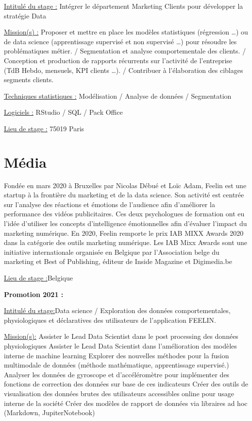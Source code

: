 \documentclass[
  letterpaper,
  DIV=11,
  numbers=noendperiod]{scrreprt}
\begin{document}
\uline{Intitulé du stage :} Intégrer le département Marketing Clients
pour développer la stratégie Data

\uline{Mission(s) :} Proposer et mettre en place les modèles
statistiques (régression \ldots) ou de data science (apprentissage
supervisé et non supervisé \ldots) pour résoudre les problématiques
métier. / Segmentation et analyse comportementale des clients. /
Conception et production de rapports récurrents sur l'activité de
l'entreprise (TdB Hebdo, mensuels, KPI clients \ldots). / Contribuer à
l'élaboration des ciblages segments clients.

\uline{Techniques statistiques :} Modélisation / Analyse de données /
Segmentation

\uline{Logiciels :} RStudio / SQL / Pack Office

\uline{Lieu de stage :} 75019 Paris


\hypertarget{muxe9dia}{%
\chapter{Média}\label{muxe9dia}}

Fondée en mars 2020 à Bruxelles par Nicolas Débué et Loïc Adam, Feelin
est une startup à la frontière du marketing et de la data science. Son
activité est centrée sur l'analyse des réactions et émotions de
l'audience afin d'améliorer la performance des vidéos publicitaires. Ces
deux psychologues de formation ont eu l'idée d'utiliser les concepts
d'intelligence émotionnelles afin d'évaluer l'impact du marketing
numérique. En 2020, Feelin remporte le prix IAB MIXX Awards 2020 dans la
catégorie des outils marketing numérique. Les IAB Mixx Awards sont une
initiative internationale organisée en Belgique par l'Association belge
du marketing et Best of Publishing, éditeur de Inside Magazine et
Digimedia.be

\uline{Lieu de stage :}Belgique

\textbf{Promotion 2021 :}

\uline{Intitulé du stage:}Data science / Exploration des données
comportementales, physiologiques et déclaratives des utilisateurs de
l'application FEELIN.

\uline{Mission(s):} Assister le Lead Data Scientist dans le post
processing des données physiologiques Assister le Lead Data Scientist
dans l'amélioration des modèles interne de machine learning Explorer des
nouvelles méthodes pour la fusion multimodale de données (méthode
mathématique, apprentissage supervisé.) Analyser les données de
gyroscope et d'accéléromètre pour implémenter des fonctions de
correction des données sur base de ces indicateurs Créer des outils de
visualisation des données brutes des utilisateurs accessibles online
pour usage interne de la société Créer des modèles de rapport de données
via libraires ad hoc (Markdown, JupiterNotebook)
\end{document}
